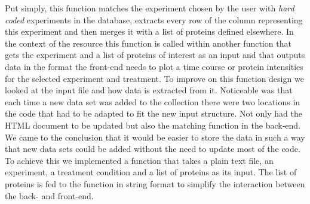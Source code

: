 Put simply, this function matches the experiment chosen by the user with \textit{hard coded} experiments in the database, extracts every row of the column representing this experiment and then merges it with a list of proteins defined elsewhere. In the context of the resource this function is called within another function that gets the experiment and a list of proteins of interest as an input and that outputs data in the format the front-end needs to plot a time course or protein intensities for the selected experiment and treatment. To improve on this function design we looked at the input file and how data is extracted from it. Noticeable was that each time a new data set was added to the collection there were two locations in the code that had to be adapted to fit the new input structure. Not only had the HTML document to be updated but also the matching function in the back-end. We came to the conclusion that it would be easier to store the data in such a way that new data sets could be added without the need to update most of the code. To achieve this we implemented a function that takes a plain text file, an experiment, a treatment condition and a list of proteins as its input. The list of proteins is fed to the function in string format to simplify the interaction between the back- and front-end.
\newpage

